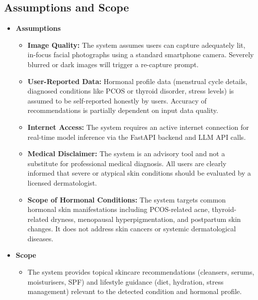 \subsection{Assumptions and Scope}
\vspace*{0.2in}
    \begin{itemize}
        \item {\fontsize{14}{16}\selectfont \textbf{Assumptions}}
        \vspace{0.5cm}
            \begin{itemize}[label=$\diamond$]
                \item \textbf{Image Quality:} The system assumes users can capture adequately lit, in-focus facial photographs using a standard smartphone camera. Severely blurred or dark images will trigger a re-capture prompt.

                \item \textbf{User-Reported Data:} Hormonal profile data (menstrual cycle details, diagnosed conditions like PCOS or thyroid disorder, stress levels) is assumed to be self-reported honestly by users. Accuracy of recommendations is partially dependent on input data quality.

                \item \textbf{Internet Access:} The system requires an active internet connection for real-time model inference via the FastAPI backend and LLM API calls.

                \item \textbf{Medical Disclaimer:} The system is an advisory tool and not a substitute for professional medical diagnosis. All users are clearly informed that severe or atypical skin conditions should be evaluated by a licensed dermatologist.

                \item \textbf{Scope of Hormonal Conditions:} The system targets common hormonal skin manifestations including PCOS-related acne, thyroid-related dryness, menopausal hyperpigmentation, and postpartum skin changes. It does not address skin cancers or systemic dermatological diseases.
            \end{itemize}
            \vspace*{0.2in}
        \item {\fontsize{14}{16}\selectfont \textbf{Scope}}
        \vspace{0.5cm}
            \begin{itemize}[label=$\diamond$]
                \item The system provides topical skincare recommendations (cleansers, serums, moisturisers, SPF) and lifestyle guidance (diet, hydration, stress management) relevant to the detected condition and hormonal profile.


\end{itemize}
\end{itemize}
